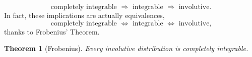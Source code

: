 \documentclass[12pt, letterpaper, reqno]{amsart}
\theoremstyle{definition}
\theoremstyle{plain}
\newtheorem{thm}{Theorem}
\theoremstyle{remark}
\begin{document}
$$ \text{completely integrable } \Rightarrow \text{ integrable } \Rightarrow \text{ involutive.} $$  
In fact, these implications are actually equivalences,
$$ \text{completely integrable } \Leftrightarrow \text{ integrable } \Leftrightarrow \text{ involutive,} $$  
thanks to Frobenius' Theorem. 

\begin{thm}[Frobenius]
	Every involutive distribution is completely integrable.	
\end{thm}

\nocite{*}

\end{document}
